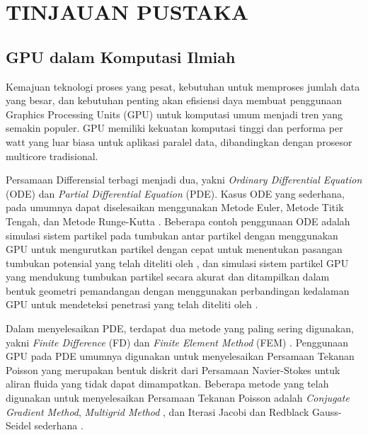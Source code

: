 \chapter{TINJAUAN PUSTAKA}
\label{tipus}

\section{GPU dalam Komputasi Ilmiah}

Kemajuan teknologi proses yang pesat, kebutuhan untuk memproses jumlah data yang
besar, dan kebutuhan penting akan efisiensi daya membuat penggunaan Graphics Processing
Units (GPU) untuk komputasi umum menjadi tren yang semakin populer. GPU memiliki
kekuatan komputasi tinggi dan performa per watt yang luar biasa untuk aplikasi
paralel data, dibandingkan dengan prosesor multicore tradisional\citep{kukunasChapterIntelPentium2015}.

Persamaan Differensial terbagi menjadi dua, yakni \emph{Ordinary Differential
Equation} (ODE) dan \emph{Partial Differential Equation} (PDE). Kasus ODE yang sederhana,
pada umumnya dapat diselesaikan menggunakan Metode Euler, Metode Titik Tengah,
dan Metode Runge-Kutta \citep{owensSurveyGeneralPurpose2007}. Beberapa contoh
penggunaan ODE adalah simulasi sistem partikel pada tumbukan antar partikel
dengan menggunakan GPU untuk mengurutkan partikel dengan cepat untuk menentukan
pasangan tumbukan potensial yang telah diteliti oleh
\cite{kipferUberFlowGPUBasedParticle2004}, dan simulasi sistem partikel GPU yang
mendukung tumbukan partikel secara akurat dan ditampilkan dalam bentuk geometri pemandangan
dengan menggunakan perbandingan kedalaman GPU untuk mendeteksi penetrasi yang telah
diteliti oleh \cite{kolbHardwarebasedSimulationCollision2004}.

Dalam menyelesaikan PDE, terdapat dua metode yang paling sering digunakan, yakni
\emph{Finite Difference} (FD) dan \emph{Finite Element Method} (FEM) \citep{owensSurveyGeneralPurpose2007}.
Penggunaan GPU pada PDE umumnya digunakan untuk menyelesaikan Persamaan Tekanan Poisson
yang merupakan bentuk diskrit dari Persamaan Navier-Stokes untuk aliran fluida yang
tidak dapat dimampatkan. Beberapa metode yang telah digunakan untuk
menyelesaikan Persamaan Tekanan Poisson adalah \emph{Conjugate Gradient Method},
\emph{Multigrid Method} \citep{bolzSparseMatrixSolvers2003}, dan Iterasi Jacobi dan
Redblack Gauss-Seidel sederhana \citep{harrisSimulationCloudDynamics2005b}.


